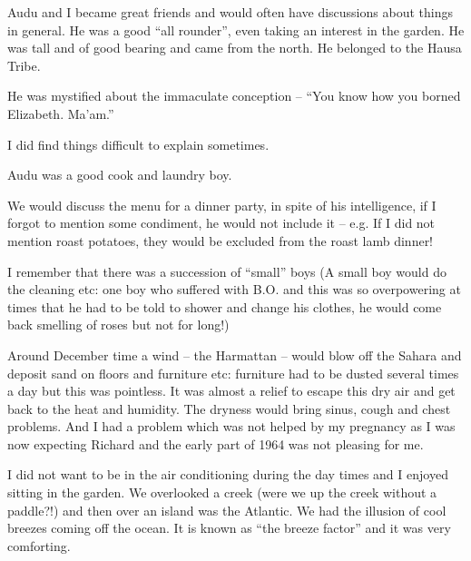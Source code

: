 Audu and I became great friends and would often have discussions about
things in general. He was a good ``all rounder'', even taking an
interest in the garden. He was tall and of good bearing and came from
the north. He belonged to the Hausa Tribe.

He was mystified about the immaculate conception -- ``You know how you
borned Elizabeth. Ma'am.''

I did find things difficult to explain sometimes.

Audu was a good cook and laundry boy.

We would discuss the menu for a dinner party, in spite of his
intelligence, if I forgot to mention some condiment, he would not
include it -- e.g. If I did not mention roast potatoes, they would be
excluded from the roast lamb dinner!

I remember that there was a succession of ``small'' boys (A small boy
would do the cleaning etc: one boy who suffered with B.O. and this was
so overpowering at times that he had to be told to shower and change
his clothes, he would come back smelling of roses but not for long!)

Around December time a wind -- the Harmattan -- would blow off the
Sahara and deposit sand on floors and furniture etc: furniture had to
be dusted several times a day but this was pointless. It was almost a
relief to escape this dry air and get back to the heat and
humidity. The dryness would bring sinus, cough and chest problems. And
I had a problem which was not helped by my pregnancy as I was now
expecting Richard and the early part of 1964 was not pleasing for me.

I did not want to be in the air conditioning during the day times and
I enjoyed sitting in the garden. We overlooked a creek (were we up the
creek without a paddle?!) and then over an island was the Atlantic. We
had the illusion of cool breezes coming off the ocean. It is known as
``the breeze factor'' and it was very comforting.


